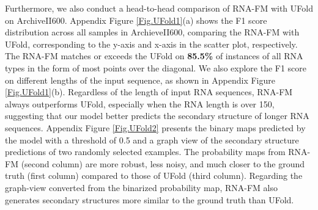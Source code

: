 Furthermore, we also conduct a head-to-head comparison of RNA-FM with UFold on ArchiveII600. Appendix Figure \ref{Fig.UFold1}(a) shows the F1 score distribution across all samples in ArchieveII600, comparing the RNA-FM with UFold, corresponding to the y-axis and x-axis in the scatter plot, respectively. The RNA-FM matches or exceeds the UFold on \textbf{85.5\%} of instances of all RNA types in the form of most points over the diagonal. We also explore the F1 score on different lengths of the input sequence, as shown in Appendix Figure \ref{Fig.UFold1}(b). Regardless of the length of input RNA sequences, RNA-FM always outperforms UFold, especially when the RNA length is over 150, suggesting that our model better predicts the secondary structure of longer RNA sequences.
Appendix Figure \ref{Fig.UFold2} presents the binary maps predicted by the model with a threshold of 0.5 and a graph view of the secondary structure predictions of two randomly selected examples. The probability maps from RNA-FM (second column) are more robust, less noisy, and much closer to the ground truth (first column) compared to those of UFold (third column). Regarding the graph-view converted from the binarized probability map, RNA-FM also generates secondary structures more similar to the ground truth than UFold.



